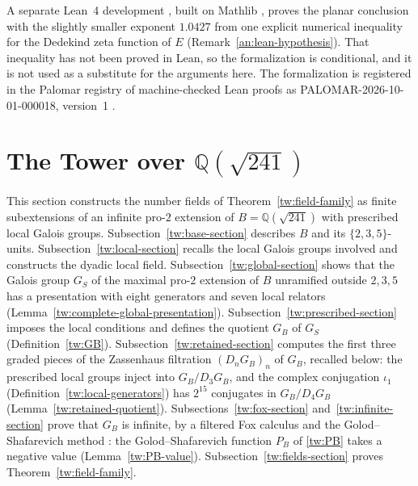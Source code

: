 \documentclass[11pt]{amsart}
\numberwithin{equation}{section}
\theoremstyle{definition}
\theoremstyle{remark}
\newcommand{\Q}{\mathbb Q}
\begin{document}
A separate Lean~4 development \cite{NaslundLean2026}, built on Mathlib
\cite{Lean4_2021,Mathlib2020}, proves the planar conclusion with the
slightly smaller exponent $1.0427$ from one explicit numerical inequality
for the Dedekind zeta function of $E$
(Remark~\ref{an:lean-hypothesis}). That inequality has not been proved in
Lean, so the formalization is conditional, and it is not used as a
substitute for the arguments here. The formalization is registered in the
Palomar registry of machine-checked Lean proofs as
PALOMAR-2026-10-01-000018, version~1 \cite{NaslundLean2026}.
\tableofcontents
\section{\texorpdfstring{The Tower over $\Q(\sqrt{241})$}{The Tower over Q(sqrt 241)}}\label{tw:tower}

This section constructs the number fields of Theorem~\ref{tw:field-family}
as finite subextensions of an infinite pro-$2$ extension of $B=\Q(\sqrt{241})$
with prescribed local Galois groups. Subsection~\ref{tw:base-section} describes $B$ and its
$\{2,3,5\}$-units. Subsection~\ref{tw:local-section} recalls the local Galois
groups involved and constructs the dyadic local field.
Subsection~\ref{tw:global-section} shows that the Galois group
$G_S$ of the maximal pro-$2$ extension of $B$ unramified outside
$2,3,5$ has a presentation with eight generators and seven local relators
(Lemma~\ref{tw:complete-global-presentation}).
Subsection~\ref{tw:prescribed-section} imposes the local conditions and
defines the quotient $G_B$ of $G_S$ (Definition~\ref{tw:GB}).
Subsection~\ref{tw:retained-section} computes the first three graded pieces
of the Zassenhaus filtration $(D_nG_B)_n$ of $G_B$, recalled below: the
prescribed local groups inject into $G_B/D_3G_B$, and the complex
conjugation $\iota_1$ (Definition~\ref{tw:local-generators}) has $2^{15}$
conjugates in $G_B/D_4G_B$ (Lemma~\ref{tw:retained-quotient}).
Subsections~\ref{tw:fox-section} and~\ref{tw:infinite-section} prove that
$G_B$ is infinite, by a filtered Fox calculus and the Golod--Shafarevich
method \cite{GolodShafarevich}: the Golod--Shafarevich function $P_B$ of
\eqref{tw:PB} takes a negative value (Lemma~\ref{tw:PB-value}).
Subsection~\ref{tw:fields-section} proves Theorem~\ref{tw:field-family}.
\end{document}
